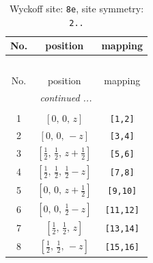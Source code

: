 \documentclass[fleqn,8pt]{jsarticle}
\begin{document}
\renewcommand{\arraystretch}{1.2}
\begin{longtable}{ccc}
\caption{Wyckoff site: {\tt 8e}, site symmetry: {\tt 2..}}
 \\
 \hline \hline
No. & position & mapping \\ \hline \endfirsthead

\multicolumn{2}{l}{\tablename\ \thetable{}} \\
 \hline \hline
No. & position & mapping \\ \hline \endhead

 \hline \hline
\multicolumn{2}{r}{\footnotesize\it continued ...} \\ \endfoot

 \hline \hline
\multicolumn{2}{r}{} \\ \endlastfoot

1 & $\left[ 0,\, 0,\, z \right]$ & {\tt [1,2]} \\ \hline
2 & $\left[ 0,\, 0,\, - z \right]$ & {\tt [3,4]} \\ \hline
3 & $\left[ \frac{1}{2},\, \frac{1}{2},\, z + \frac{1}{2} \right]$ & {\tt [5,6]} \\ \hline
4 & $\left[ \frac{1}{2},\, \frac{1}{2},\, \frac{1}{2} - z \right]$ & {\tt [7,8]} \\ \hline
5 & $\left[ 0,\, 0,\, z + \frac{1}{2} \right]$ & {\tt [9,10]} \\ \hline
6 & $\left[ 0,\, 0,\, \frac{1}{2} - z \right]$ & {\tt [11,12]} \\ \hline
7 & $\left[ \frac{1}{2},\, \frac{1}{2},\, z \right]$ & {\tt [13,14]} \\ \hline
8 & $\left[ \frac{1}{2},\, \frac{1}{2},\, - z \right]$ & {\tt [15,16]} \\
\end{longtable}
\renewcommand{\arraystretch}{1.2}
\end{document}
